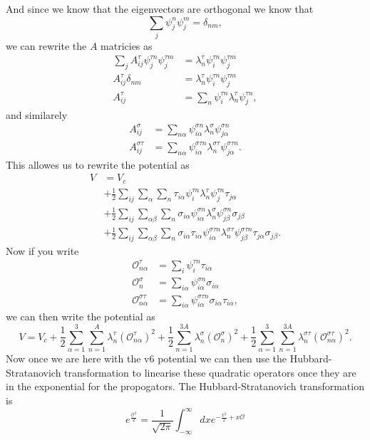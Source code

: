 \documentclass[12pt]{extarticle}
\newcommand{\Ot}{\mathcal{O}^\tau_{n\alpha}}
\newcommand{\Os}{\mathcal{O}^\sigma_{n}}
\newcommand{\Ost}{\mathcal{O}^{\sigma\tau}_{n\alpha}}
\begin{document}
And since we know that the eigenvectors are orthogonal we know that
\begin{equation}
  \sum_j \psi ^n_j \psi^m_j = \delta_{nm},
\end{equation}
we can rewrite the $A$ matricies as
\begin{align}
  \sum_{j} A^\tau_{ij} \psi^{\tau n}_j \psi^{\tau m}_j &= \lambda^\tau_n \psi^{\tau n}_i \psi^{\tau m}_j \\
  A^\tau_{ij} \delta_{nm} &= \lambda^\tau_n \psi^{\tau n}_i \psi^{\tau m}_j \\
  A^\tau_{ij} &= \sum_n \psi^{\tau n}_i \lambda^\tau_n \psi^{\tau n}_j,
\end{align}
and similarely
\begin{align}
  A^\sigma_{ij} &= \sum_{n \alpha} \psi^{\sigma n}_{i \alpha} \lambda^\sigma_n \psi^{\sigma n}_{j \alpha} \\
  A^{\sigma\tau}_{ij} &= \sum_{n \alpha} \psi^{\sigma\tau n}_{i \alpha} \lambda^{\sigma\tau}_n \psi^{\sigma\tau n}_{j \alpha}.
\end{align}
This allowes us to rewrite the potential as 
\begin{equation}
\begin{split}
  V &= V_c \\
  &+ \frac{1}{2}\sum_{ij}\sum_{\alpha}\sum_{n}\tau_{i\alpha}\psi^{\tau n}_{i}\lambda^\tau_n\psi^{\tau n}_{j}\tau_{j\alpha} \\
  &+ \frac{1}{2}\sum_{ij}\sum_{\alpha\beta}\sum_{n}\sigma_{i\alpha}\psi^{\sigma n}_{i\alpha}\lambda^\sigma_n\psi^{\sigma n}_{j\beta}\sigma_{j\beta} \\
  &+ \frac{1}{2}\sum_{ij}\sum_{\alpha\beta}\sum_{n}\sigma_{i\alpha}\tau_{i\alpha}\psi^{\sigma\tau n}_{i\alpha}\lambda^{\sigma\tau}_n\psi^{\sigma\tau n}_{j\beta}\tau_{j\alpha}\sigma_{j\beta}.
\end{split}
\end{equation}
Now if you write 
\begin{align}
  \Ot &= \sum_i \psi_i^{\tau n} \tau_{i\alpha} \\
  \Os &= \sum_{i\alpha} \psi_{i\alpha}^{\sigma n} \sigma_{i\alpha} \\
  \Ost &= \sum_{i\alpha} \psi_{i\alpha}^{\sigma\tau n} \sigma_{i\alpha}\tau_{i\alpha},
\end{align}
we can then write the potential as
\begin{equation}
  V = V_c + \frac{1}{2}\sum_{\alpha=1}^3\sum_{n=1}^A \lambda^\tau_n (\Ot)^2 + \frac{1}{2}\sum_{n=1}^{3A} \lambda^\sigma_n (\Os)^2 + \frac{1}{2}\sum_{\alpha=1}^3\sum_{n=1}^{3A} \lambda^{\sigma\tau}_n (\Ost)^2.
\end{equation}
Now once we are here with the v6 potential we can then use the Hubbard-Stratanovich transformation to linearise these quadratic operators once they are in the exponential for the propogators. The Hubbard-Stratanovich transformation is
\begin{equation}
  e^{\frac{\mathcal{O}^2}{2}} = \frac{1}{\sqrt{2\pi}} \int_{-\infty}^{\infty} dx e^{-\frac{x^2}{2} + x\mathcal{O}}
\end{equation}



\end{document}
